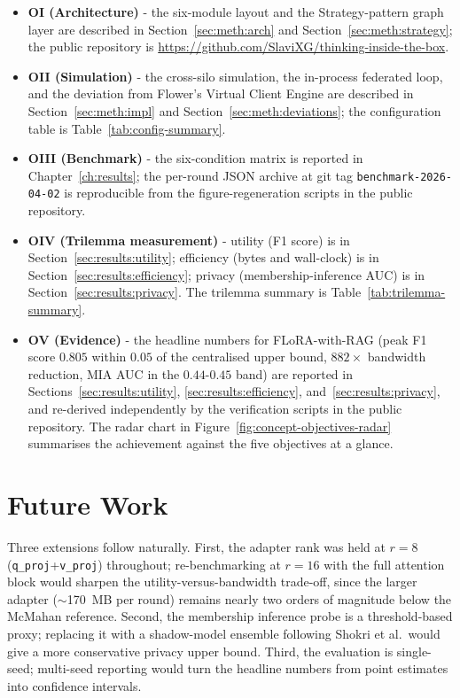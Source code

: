 \documentclass{report}
\begin{document}
\begin{itemize}
    \setlength\itemsep{0em}
    \item \textbf{OI (Architecture)} - the six-module layout and the Strategy-pattern graph layer are described in Section~\ref{sec:meth:arch} and Section~\ref{sec:meth:strategy}; the public repository is \url{https://github.com/SlaviXG/thinking-inside-the-box}.
    \item \textbf{OII (Simulation)} - the cross-silo simulation, the in-process federated loop, and the deviation from Flower's Virtual Client Engine are described in Section~\ref{sec:meth:impl} and Section~\ref{sec:meth:deviations}; the configuration table is Table~\ref{tab:config-summary}.
    \item \textbf{OIII (Benchmark)} - the six-condition matrix is reported in Chapter~\ref{ch:results}; the per-round JSON archive at git tag \texttt{benchmark-2026-04-02} is reproducible from the figure-regeneration scripts in the public repository.
    \item \textbf{OIV (Trilemma measurement)} - utility (F1 score) is in Section~\ref{sec:results:utility}; efficiency (bytes and wall-clock) is in Section~\ref{sec:results:efficiency}; privacy (membership-inference AUC) is in Section~\ref{sec:results:privacy}. The trilemma summary is Table~\ref{tab:trilemma-summary}.
    \item \textbf{OV (Evidence)} - the headline numbers for FLoRA-with-RAG (peak F1 score $0.805$ within $0.05$ of the centralised upper bound, $882\times$ bandwidth reduction, MIA AUC in the $0.44$-$0.45$ band) are reported in Sections~\ref{sec:results:utility}, \ref{sec:results:efficiency}, and~\ref{sec:results:privacy}, and re-derived independently by the verification scripts in the public repository. The radar chart in Figure~\ref{fig:concept-objectives-radar} summarises the achievement against the five objectives at a glance.
\end{itemize}

\section{Future Work}
\label{sec:concl:future}

Three extensions follow naturally. First, the adapter rank was held at $r=8$ (\texttt{q\_proj}+\texttt{v\_proj}) throughout; re-benchmarking at $r=16$ with the full attention block would sharpen the utility-versus-bandwidth trade-off, since the larger adapter ($\sim$170~MB per round) remains nearly two orders of magnitude below the McMahan reference. Second, the membership inference probe is a threshold-based proxy; replacing it with a shadow-model ensemble following Shokri et al.\ would give a more conservative privacy upper bound. Third, the evaluation is single-seed; multi-seed reporting would turn the headline numbers from point estimates into confidence intervals.
\end{document}
